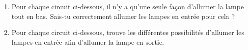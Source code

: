 \documentclass[class=report,crop=false, 12pt]{standalone}
\begin{document}
\begin{activite}
\begin{enumerate}

  
  \item Pour chaque circuit ci-dessous, il n'y a qu'une seule façon d'allumer la lampe tout en bas. Sais-tu correctement allumer les lampes en entrée pour cela ?
  

  
  \item Pour chaque circuit ci-dessous, trouve les différentes possibilités d'allumer les lampes en entrée afin d'allumer la lampe en sortie.


\end{enumerate}

\end{activite}
\end{document}
